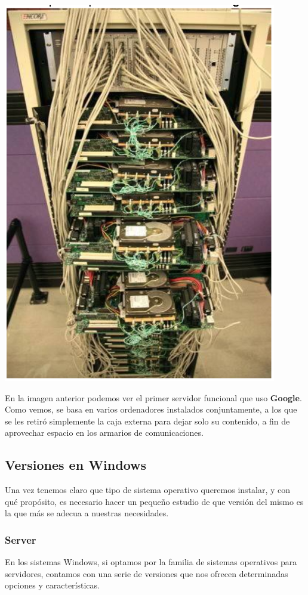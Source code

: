 \documentclass[11pt]{article}
\begin{document}
\begin{center}
\includegraphics[width=.9\linewidth]{ArquitecturaSistemaOperativo/SO_Google.PNG}
\end{center}

En la imagen anterior podemos ver el primer servidor funcional que uso
\textbf{Google}. Como vemos, se basa en varios ordenadores instalados
conjuntamente, a los que se les retiró simplemente la caja externa para
dejar solo su contenido, a fin de aprovechar espacio en los armarios de
comunicaciones.

\subsection{Versiones en Windows}
\label{sec:orgcfd859c}
Una vez tenemos claro que tipo de sistema operativo queremos instalar, y
con qué propósito, es necesario hacer un pequeño estudio de que versión
del mismo es la que más se adecua a nuestras necesidades.

\subsubsection{Server}
\label{sec:org07e6a3f}
En los sistemas Windows, si optamos por la familia de sistemas
operativos para servidores, contamos con una serie de versiones que nos
ofrecen determinadas opciones y características.
\end{document}
